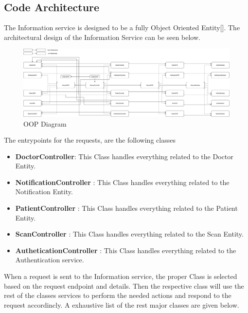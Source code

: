 		\subsection{Code Architecture}
		The Information service is designed to be a fully Object Oriented Entity[\cite{oop}].
		The architectural design of the Information Service can be seen below.\pagebreak
		\begin{figure}[H]
			\iftrue
			\caption{OOP Diagram}
			\centering
			\includegraphics[angle=90,origin=c,scale=0.3]{figures/InformationServiceArchitecture}
			\fi
		\end{figure}\pagebreak
		The entrypoints for the requests, are the following classes
		\begin{itemize}
			\item \textbf{DoctorController}: This Class handles everything related to the Doctor Entity.
			\item \textbf{NotificationController} : This Class handles everything related to the Notification Entity.
			\item \textbf{PatientController} : This Class handles everything related to the Patient Entity.
			\item \textbf{ScanController} : This Class handles everything related to the Scan Entity.
			\item \textbf{AutheticationController} : This Class handles everything related to the Authentication service.
		\end{itemize}
		When a request is sent to the Information service, the proper Class is selected based on the request endpoint and details. 
		Then the respective class will use the rest of the classes services to perform the needed actions and respond to the request
		accordincly. A exhaustive list of the rest major classes are given below.
